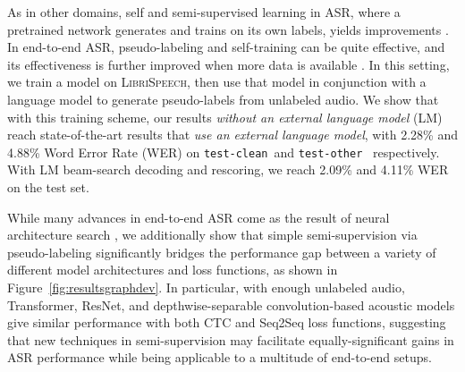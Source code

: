 \documentclass{article}
\def\testclean{\texttt{test-clean}}
\def\testother{\texttt{test-other}}
\newcommand{\librispeech}{\textsc{LibriSpeech}}
\begin{document}
As in other domains, self and semi-supervised learning in ASR, where a pretrained network generates and trains on its own labels, yields improvements \cite{vesely2017semi}. In end-to-end ASR, pseudo-labeling and self-training can be quite effective, and its effectiveness is further improved when more data is available \cite{kahn2019self}. In this setting, we train a model on \librispeech, then use that model in conjunction with a language model to generate pseudo-labels from unlabeled audio. We show that with this training scheme, our results \textit{without an external language model} (LM) reach state-of-the-art results that \textit{use an external language model}, with 2.28\% and 4.88\% Word Error Rate (WER) on \testclean~and \testother~ respectively. With LM beam-search decoding and rescoring, we reach 2.09\% and 4.11\% WER on the test set.

While many advances in end-to-end ASR come as the result of neural architecture search \cite{prabhavalkar2017comparison,zhou2018comparison,chiu2018state}, we additionally show that simple semi-supervision via pseudo-labeling significantly bridges the performance gap between a variety of different model architectures and loss functions, as shown in Figure~\ref{fig:resultsgraphdev}. In particular, with enough unlabeled audio, Transformer, ResNet, and depthwise-separable convolution-based acoustic models give similar performance with both CTC and Seq2Seq loss functions, suggesting that new techniques in semi-supervision may facilitate equally-significant gains in ASR performance while being applicable to a multitude of end-to-end setups.
\end{document}
